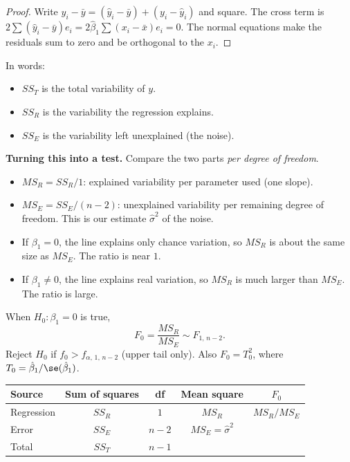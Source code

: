 \begin{proof}
Write $y_i-\bar{y}=(\hat{y}_i-\bar{y})+(y_i-\hat{y}_i)$ and square. The cross term is $2\sum(\hat{y}_i-\bar{y})e_i=2\hat\beta_1\sum(x_i-\bar{x})e_i=0$. The normal equations make the residuals sum to zero and be orthogonal to the $x_i$.
\end{proof}

In words:
\begin{itemize}
  \item $SS_T$ is the total variability of $y$.
  \item $SS_R$ is the variability the regression explains.
  \item $SS_E$ is the variability left unexplained (the noise).
\end{itemize}

\textbf{Turning this into a test.} Compare the two parts \emph{per degree of freedom}.
\begin{itemize}
  \item $MS_R=SS_R/1$: explained variability per parameter used (one slope).
  \item $MS_E=SS_E/(n-2)$: unexplained variability per remaining degree of freedom. This is our estimate $\hat\sigma^2$ of the noise.
  \item If $\beta_1=0$, the line explains only chance variation, so $MS_R$ is about the same size as $MS_E$. The ratio is near $1$.
  \item If $\beta_1\ne0$, the line explains real variation, so $MS_R$ is much larger than $MS_E$. The ratio is large.
\end{itemize}

\begin{theorem}\label{thm:regF}
When $H_0:\beta_1=0$ is true,
\[ F_0=\frac{MS_R}{MS_E}\sim F_{1,\,n-2}. \]
Reject $H_0$ if $f_0>f_{\alpha,\,1,\,n-2}$ (upper tail only). Also $F_0=T_0^2$, where $T_0=\hat\beta_1/\se(\hat\beta_1)$.
\end{theorem}

\begin{center}
\begin{tabular}{lcccc}
\toprule
Source & Sum of squares & df & Mean square & $F_0$ \\
\midrule
Regression & $SS_R$ & $1$ & $MS_R$ & $MS_R/MS_E$ \\
Error & $SS_E$ & $n-2$ & $MS_E=\hat\sigma^2$ & \\
Total & $SS_T$ & $n-1$ & & \\
\bottomrule
\end{tabular}
\end{center}

